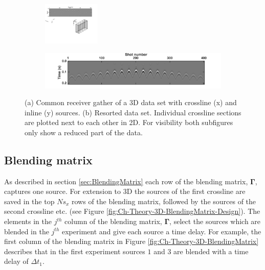 \begin{figure}
	
	\begin{subfigure}[t]{\textwidth}
	 	\centering
		\includegraphics[width = 0.3\textwidth]{Plots/data3d}
		\caption{}
		\label{fig:Ch-Theory-Data3d}
	\end{subfigure}
	\par\bigskip
	\begin{subfigure}[t]{\textwidth}
		\centering
		\includegraphics[width = \textwidth]{Plots/IdealData3d/p_Delphi}
		\caption{}
		\label{fig:Ch-Theory-Data3d_Delphi}
	\end{subfigure}
	
	\caption{(a) Common receiver gather of a 3D data set with crossline (x) and inline (y) sources. (b) Resorted data set. Individual crossline sections are plotted next to each other in 2D. For visibility both subfigures only show a reduced part of the data.}
	\label{fig:Ch-Theory-DataSorting}
\end{figure}


\subsection*{Blending matrix}

As described in section \ref{sec:BlendingMatrix} each row of the blending matrix, $\mathbf{\Gamma}$, captures one source. For extension to 3D the sources of the first crossline are saved in the top $Ns_x$ rows of the blending matrix, followed by the sources of the second crossline etc. (see Figure \ref{fig:Ch-Theory-3D-BlendingMatrix-Design}). The elements in the $j^{th}$ column of the blending matrix, $\mathbf{\Gamma}$, select the sources which are blended in the $j^{th}$ experiment and give each source a time delay. For example, the first column of the blending matrix in Figure \ref{fig:Ch-Theory-3D-BlendingMatrix} describes that in the first experiment sources $1$ and $3$ are blended with a time delay of $\Delta t_1$.

